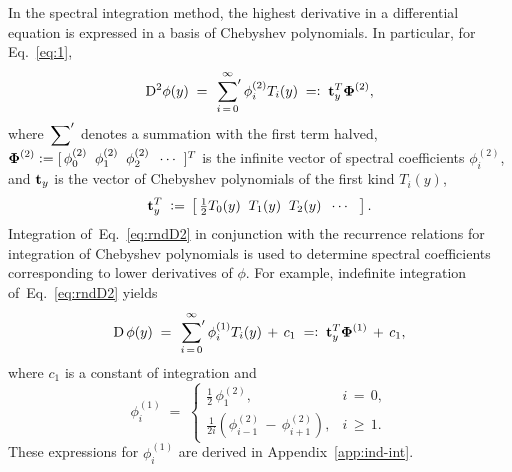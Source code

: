 \documentclass[%
secnumarabic,%
 amssymb, amsmath,%
 aps,prf,superscriptaddress,longbibliography
frontmatterverbose,
]{revtex4-2}
\newcommand{\DefinedAs}[0]{\mathrel{\mathop:}=}
\newcommand{\AsDefined}[0]{=\mathrel{\mathop:}}
\begin{document}
In the spectral integration method, the highest derivative in a differential equation is expressed in a basis of Chebyshev polynomials. In particular, for Eq.~\eqref{eq:1},
\begin{align}
  \D^2\phi (y) \;=\; 
  	\sideset{}{'}\sum_{i \, = \, 0}^{\infty} \phi_i^{(2)} T_i(y)
 	\; \AsDefined \;
	  \HH t_y^T \BB \Phi^{(2)},
	  \label{eq:rndD2}
\end{align}
where $\sideset{}{'}\sum$ denotes a summation with the first term halved, $\BB \Phi^{(2)} \DefinedAs [\,\phi^{(2)}_0\;\; \phi^{(2)}_1\;\; \phi^{(2)}_2 \;\; \cdots \;\; ]^T$ is the infinite vector of spectral coefficients $\phi_i^{(2)}$, and $\mathbf{t}_y$ is the vector of Chebyshev polynomials of the first kind $T_i(y)$,
\begin{equation}\label{eq:t}
  \HH t_y^T \; \DefinedAs \, \left[\,\tfrac{1}{2}T_0(y)\;\; T_1(y)\;\; T_2(y)\;\;  \cdots \;\;\; \right].
\end{equation}
Integration of~Eq.~\eqref{eq:rndD2} in conjunction with the recurrence relations for integration of Chebyshev polynomials is used to determine spectral coefficients corresponding to lower derivatives of $\phi$. For example, indefinite integration of~Eq.~\eqref{eq:rndD2} yields
\begin{align}
  \D\, \phi (y) \;=\; \sideset{}{'}\sum_{i \, = \, 0}^{\infty} \phi_i^{(1)} T_i(y) \,+\, c_1 
  \; \AsDefined \;
	  \HH t_y^T \BB \Phi^{(1)} \,+\, c_1, \label{eq:rndD1}
  \end{align}
where $c_1$ is a constant of integration and %
\begin{equation}\label{ss}
  \phi_i^{(1)} \;=\;
  \begin{cases}
    \tfrac{1}{2} \, \phi_1^{(2)}, & i \, = \, 0,
    \\[0.1cm]
  \tfrac{1}{2i} (\phi_{i-1}^{(2)}\,-\,\phi_{i+1}^{(2)}), &  i \, \geq \, 1.
  \end{cases}
  \end{equation}
These expressions for $\phi_i^{(1)}$ are derived in Appendix~\ref{app:ind-int}.

\end{document}
